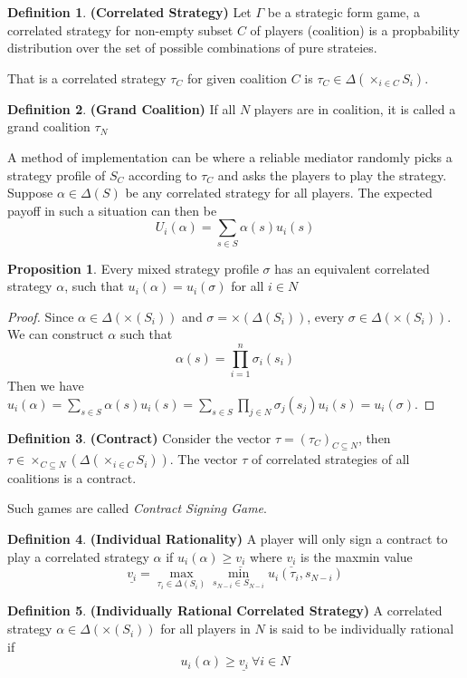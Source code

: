 \documentclass{article}
\theoremstyle{definition}
\newtheorem{defn}{Definition}[section]
\newtheorem{prop}{Proposition}[section]
\begin{document}
\begin{defn}
\textbf{(Correlated Strategy)} Let $\Gamma$ be a strategic form game, a correlated strategy for non-empty subset $C$ of players (coalition) is a propbability distribution over the set of possible combinations of pure strateies.
\end{defn}
That is a correlated strategy $\tau_C$ for given coalition $C$ is $\tau_C \in \Delta(\times_{i\in C} S_i)$. 
\begin{defn}
\textbf{(Grand Coalition)} If all $N$ players are in coalition, it is called a grand coalition $\tau_N$
\end{defn}
A method of implementation can be where a reliable mediator randomly picks a strategy profile of $S_C$ according to $\tau_C$ and asks the players to play the strategy.\\
Suppose $\alpha\in \Delta(S)$ be any correlated strategy for all players. The expected payoff in such a situation can then be $$U_i(\alpha) = \sum_{s\in S} \alpha(s)u_i(s)$$
\begin{prop}
Every mixed strategy profile $\sigma$ has an equivalent correlated strategy $\alpha$, such that $u_i(\alpha) = u_i(\sigma)$ for all $i\in N$
\end{prop}
\begin{proof}
Since $\alpha \in \Delta(\times(S_i))$ and $\sigma = \times (\Delta(S_i))$, every $\sigma \in \Delta(\times(S_i))$. We can construct $\alpha$ such that $$\alpha(s) = \prod_{i =1}^n \sigma_i(s_i)$$ Then we have $u_i(\alpha) = \sum_{s\in S} \alpha(s)u_i(s) = \sum_{s\in S} \prod_{j\in N}\sigma_j(s_j) u_i(s) = u_i(\sigma)$.
\end{proof}
\begin{defn}
\textbf{(Contract)} Consider the vector $\tau = (\tau_C)_{C\subseteq N}$, then $\tau \in \times_{C\subseteq N} (\Delta(\times_{i\in C} S_i))$. The vector $\tau$ of correlated strategies of all coalitions is a contract.
\end{defn}
Such games are called \textit{Contract Signing Game}.
\begin{defn}
\textbf{(Individual Rationality)} A player will only sign a contract to play a correlated strategy $\alpha$ if $u_i(\alpha)\geq \underline{v_i}$ where $\underline{v_i}$ is the maxmin value $$\underline{v_i} =\max_{\tau_i\in \Delta(S_i)} \min_{s_{N-i}\in S_{N-i}} u_i(\tau_i,s_{N-i})$$
\end{defn}
\begin{defn}
\textbf{(Individually Rational Correlated Strategy)} A correlated strategy $\alpha \in \Delta(\times (S_i))$ for all players in $N$ is said to be individually rational if $$u_i(\alpha)\geq \underline{v_i} ~\forall i\in N$$
\end{defn}
\end{document}
